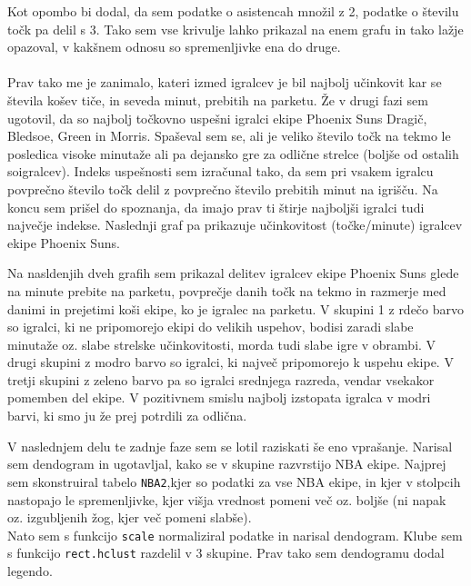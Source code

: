 \documentclass[11pt,a4paper]{article}
\begin{document}
Kot opombo bi dodal, da sem podatke o asistencah množil z 2, podatke o številu točk pa delil s 3. Tako sem vse krivulje lahko prikazal na enem grafu in tako lažje opazoval, v kakšnem odnosu so spremenljivke ena do druge.\\


\\

Prav tako me je zanimalo, kateri izmed igralcev je bil najbolj učinkovit kar se števila košev tiče, in seveda minut, prebitih na parketu. Že v drugi fazi sem ugotovil, da so najbolj točkovno uspešni igralci ekipe Phoenix Suns Dragič, Bledsoe, Green in Morris. Spaševal sem se, ali je veliko število točk na tekmo le posledica visoke minutaže ali pa dejansko gre za odlične strelce (boljše od ostalih soigralcev). Indeks uspešnosti sem izračunal tako, da sem pri vsakem igralcu povprečno število točk delil z povprečno število prebitih minut na igrišču. Na koncu sem prišel do spoznanja, da imajo prav ti štirje najboljši igralci tudi največje indekse. Naslednji graf pa prikazuje učinkovitost (točke/minute) igralcev ekipe Phoenix Suns.\\

Na nasldenjih dveh grafih sem prikazal delitev igralcev ekipe Phoenix Suns glede na minute prebite na parketu, povprečje danih točk na tekmo in razmerje med danimi in prejetimi koši ekipe, ko je igralec na parketu. V skupini 1 z rdečo barvo so igralci, ki ne pripomorejo ekipi do velikih uspehov, bodisi zaradi slabe minutaže oz. slabe strelske učinkovitosti, morda tudi slabe igre v obrambi. V drugi skupini z modro barvo so igralci, ki največ pripomorejo k uspehu ekipe. V tretji skupini z zeleno barvo pa so igralci srednjega razreda, vendar vsekakor pomemben del ekipe. V pozitivnem smislu najbolj izstopata igralca v modri barvi, ki smo ju že prej potrdili za odlična.


V naslednjem delu te zadnje faze sem se lotil raziskati še eno vprašanje. Narisal sem dendogram in ugotavljal, kako se v skupine razvrstijo NBA ekipe. Najprej sem skonstruiral tabelo \verb|NBA2|,kjer so podatki za vse NBA ekipe,
in kjer v stolpcih nastopajo le spremenljivke, kjer višja vrednost pomeni več oz. boljše (ni napak oz. izgubljenih žog, kjer več pomeni slabše).\\

Nato sem s funkcijo \verb|scale| normaliziral podatke in narisal dendogram.
Klube sem s funkcijo \verb|rect.hclust| razdelil v 3 skupine. Prav tako sem dendogramu dodal legendo.\\
\end{document}
